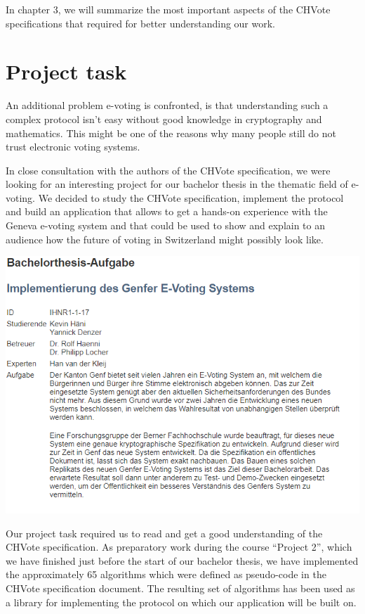 In chapter 3, we will summarize the most important aspects of the CHVote specifications that required for better understanding our work.

\section{Project task}
An additional problem e-voting is confronted, is that understanding such a complex protocol isn't easy without good knowledge in cryptography and mathematics. This might be one of the reasons why many people still do not trust electronic voting systems. 

In close consultation with the authors of the CHVote specification, we were looking for an interesting project for our bachelor thesis in the thematic field of e-voting. We decided to study the CHVote specification, implement the protocol and build an application that allows to get a hands-on experience with the Geneva e-voting system and that could be used to show and explain to an audience how the future of voting in Switzerland might possibly look like.

\begin{center}
\includegraphics[scale=0.95]{assets/aufgabe.PNG}
\label{Bachelor thesis task}%
\end{center}

Our project task required us to read and get a good understanding of the CHVote specification. As preparatory work during the course "`Project 2"', which we have finished just before the start of our bachelor thesis, we have implemented the approximately 65 algorithms which were defined as pseudo-code in the CHVote specification document. The resulting set of algorithms has been used as a library for implementing the protocol on which our application will be built on.

